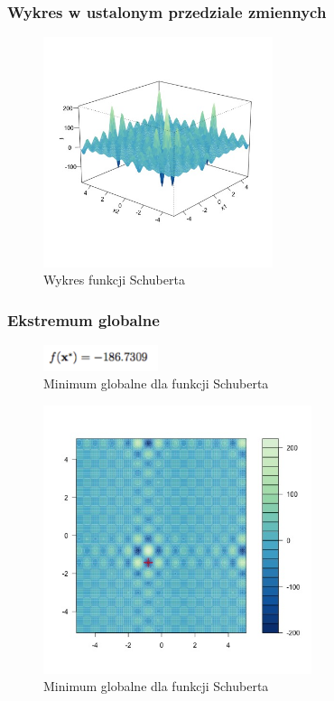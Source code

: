 \documentclass{article}
\begin{document}
    

    \subsubsection{Wykres w ustalonym przedziale zmiennych}
    
    \begin{figure}[!htbp]
    \centering
    \includegraphics[width=0.6\textwidth]{inc/wykresyfunkcji/schubert}
     \caption{Wykres  funkcji Schuberta}
    \end{figure}
    
   

    \subsubsection{Ekstremum globalne}
    
       \begin{figure}[!htbp]
    \centering
    \includegraphics[width=0.3\textwidth]{inc/wzory/schubert-global-minimum}
     \caption{Minimum globalne dla funkcji Schuberta}
    \end{figure}
    
       \begin{figure}[!htbp]
    \centering
    \includegraphics[width=0.7\textwidth]{inc/wykresyfunkcji/schubert-global-minimum}
     \caption{Minimum globalne dla funkcji Schuberta}
    \end{figure}
    
\end{document}
